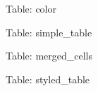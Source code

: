 \documentclass[12pt]{article}
\begin{document}
Table: color



\newpage
Table: simple\_table



\newpage
Table: merged\_cells



\newpage
Table: styled\_table


\end{document}

